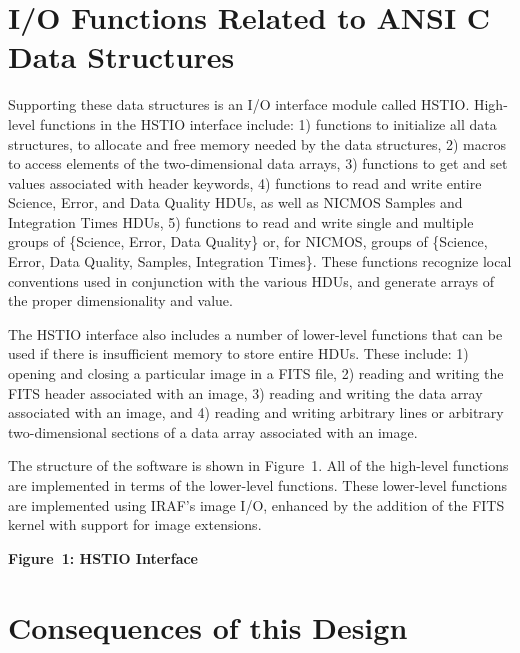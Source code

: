 \section{ I/O Functions Related to ANSI C Data Structures }

Supporting these data structures is an I/O interface module called
HSTIO.  High-level functions in the HSTIO interface include:
1) functions to initialize all data structures, to allocate and
free memory needed by the data structures,
2) macros to access elements of the two-dimensional data arrays,
3) functions to get and set values associated with header keywords,
4) functions to read and write entire Science, Error, and Data Quality HDUs,
as well as NICMOS Samples and Integration Times HDUs,
5) functions to read and write single and multiple groups of
\{Science, Error, Data Quality\} or, for NICMOS, groups of 
\{Science, Error, Data Quality, Samples, Integration Times\}.
These functions recognize local conventions used in conjunction
with the various HDUs, and generate arrays of the proper 
dimensionality and value.

The HSTIO interface also includes a number of lower-level functions
that can be used if there is insufficient memory to store entire HDUs.
These include:
1) opening and closing a particular image in a FITS file,
2) reading and writing the FITS header associated with an image,
3) reading and writing the data array associated with an image, and
4) reading and writing arbitrary lines or arbitrary two-dimensional sections
of a data array associated with an image.

The structure of the software is shown in Figure~1.  All of the
high-level functions are implemented in terms of the lower-level functions.
These lower-level functions are implemented using IRAF's image I/O, enhanced
by the addition of the FITS kernel with support for image extensions.


\centerline{}
\begin{center}
{\bf Figure~1:  HSTIO Interface}
\end{center}

\section{Consequences of this Design }


